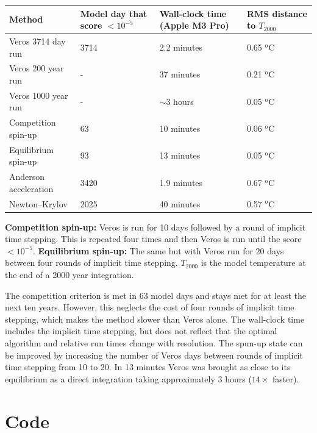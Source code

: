 \documentclass{article}
\begin{document}
\begin{center}
\begin{tabular}{l|p{2.4cm}|p{2.4cm}|p{2.2cm}}
Method & Model day that score $< 10^{-5}$ & Wall-clock time \newline (Apple M3 Pro) & RMS distance to $T_{2000}$ \\ 
\hline
Veros 3714 day run & 3714 & 2.2 minutes & 0.65 $^{\text{o}}$C \\  
Veros 200 year run & - & 37 minutes & 0.21 $^{\text{o}}$C \\
Veros 1000 year run & - & $\sim3$ hours & 0.05 $^{\text{o}}$C \\
Competition spin-up & 63 & 10 minutes & 0.06 $^{\text{o}}$C \\
Equilibrium spin-up & 93 & 13 minutes & 0.05 $^{\text{o}}$C \\
Anderson acceleration & 3420 & 1.9 minutes & 0.67 $^{\text{o}}$C \\
Newton--Krylov & 2025 & 40 minutes & 0.57 $^{\text{o}}$C \\
\end{tabular}
\end{center}
{\bf Competition spin-up:} Veros is run for 10 days followed by a round of implicit time stepping. This is repeated four times and then Veros is run until the score $<10^{-5}$. {\bf Equilibrium spin-up:} The same but with Veros run for 20 days between four rounds of implicit time stepping. $T_{2000}$ is the model temperature at the end of a 2000 year integration.

The competition criterion is met in 63 model days and stays met for at least the next ten years. However, this neglects the cost of four rounds of implicit time stepping, which makes the method slower than Veros alone. The wall-clock time includes the implicit time stepping, but does not reflect that the optimal algorithm and relative run times change with resolution. The spun-up state can be improved by increasing the number of Veros days between rounds of implicit time stepping from 10 to 20. In 13 minutes Veros was brought as close to its equilibrium as a direct integration taking approximately 3 hours ($14 \times$ faster).

\newpage

\section*{Code}
\end{document}
